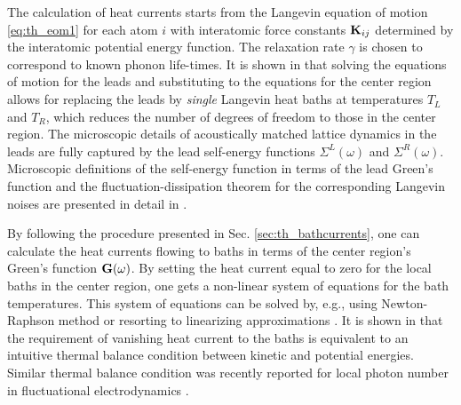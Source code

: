 The calculation of heat currents starts from the Langevin equation of motion \eqref{eq:th_eom1} for each atom $i$ with interatomic force constants $\mathbf{K}_{ij}$ determined by the interatomic potential energy function. The relaxation rate $\gamma$ is chosen to correspond to known phonon life-times. It is shown in  that solving the equations of motion for the leads and substituting to the equations for the center region allows for replacing the leads by \textit{single} Langevin heat baths at temperatures $T_L$ and $T_R$, which reduces the number of degrees of freedom to those in the center region. The microscopic details of acoustically matched lattice dynamics in the leads are fully captured by the lead self-energy functions $\Sigma^L(\omega)$ and $\Sigma^R(\omega)$. Microscopic definitions of the self-energy function in terms of the lead Green's function and the fluctuation-dissipation theorem for the corresponding Langevin noises are presented in detail in .

By following the procedure presented in Sec. \ref{sec:th_bathcurrents}, one can calculate the heat currents flowing to baths in terms of the center region's Green's function $\mathbf{G}(\omega)$. By setting the heat current equal to zero for the local baths in the center region, one gets a non-linear system of equations for the bath temperatures. This system of equations can be solved by, e.g., using Newton-Raphson method \cite{bandyopadhyay11} or resorting to linearizing approximations \cite{segal09}. It is shown in  that the requirement of vanishing heat current to the baths is equivalent to an intuitive thermal balance condition between kinetic and potential energies. Similar thermal balance condition was recently reported for local photon number in fluctuational electrodynamics \cite{partanen14}. 

